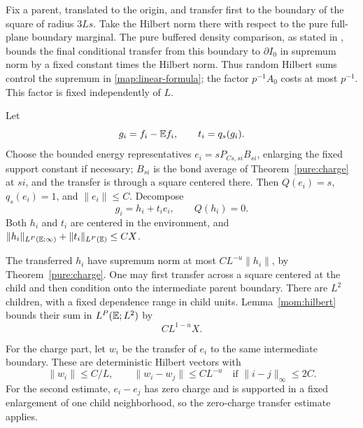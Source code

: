 Fix a parent, translated to the origin, and transfer first to the
boundary of the square of radius $3Ls$.  Take the Hilbert norm there
with respect to the pure full-plane boundary marginal.  The pure
buffered density comparison, as stated in
\cite[Section~2, Proposition ``Buffered and small-patch comparisons'']{S},
bounds the final conditional transfer from this boundary to
$\partial I_0$ in supremum norm by a fixed constant times the Hilbert
norm.  Thus random Hilbert sums control the supremum in
\eqref{map:linear-formula}; the factor $p^{-1}A_0$ costs at most $p^{-1}$.
This factor is fixed independently of $L$.

Let
\[
 g_i=f_i-\mathbb E f_i,\qquad t_i=q_s(g_i).
\]
Choose the bounded energy representatives
$e_i=sP_{Cs,si}B_{si}$, enlarging the fixed support constant if necessary;
$B_{si}$ is the bond average of Theorem~\ref{pure:charge} at $si$,
and the transfer is through a square centered there.
Then $Q(e_i)=s$, $q_s(e_i)=1$, and $\|e_i\|\le C$.
Decompose
\[
 g_i=h_i+t_ie_i,\qquad Q(h_i)=0.
\]
Both $h_i$ and $t_i$ are centered in the environment, and
$\|h_i\|_{L^P(\mathbb E;\infty)}+\|t_i\|_{L^P(\mathbb E)}\le CX$.

The transferred $h_i$ have supremum norm at most
$CL^{-u}\|h_i\|$, by Theorem~\ref{pure:charge}.  One may first
transfer across a square centered at the child and then condition onto
the intermediate parent boundary.  There are $L^2$ children, with a
fixed dependence range in child units.  Lemma~\ref{mom:hilbert} bounds
their sum in $L^P(\mathbb E;L^2)$ by
\begin{equation}\label{mom:stable-fluctuation}
 CL^{1-u}X.
\end{equation}

For the charge part, let $w_i$ be the transfer of $e_i$ to the same
intermediate boundary.  These are deterministic Hilbert vectors with
\begin{equation}\label{mom:energy-vectors}
 \|w_i\|\le C/L,\qquad
 \|w_i-w_j\|\le CL^{-u}
 \quad\text{if }\|i-j\|_\infty\le2C.
\end{equation}
For the second estimate, $e_i-e_j$ has zero charge and is supported in
a fixed enlargement of one child neighborhood, so the zero-charge
transfer estimate applies.

